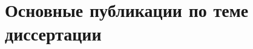 \section*{\centering Основные публикации по теме диссертации}

\nocite{MZG2015, KMU2015, KMU2016, KMU17, MZG2017, Kazan2015, Vest18, Almanac2017}

